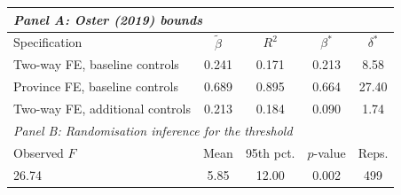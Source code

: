 \begin{tabular}{lcccc}
\toprule
\multicolumn{5}{l}{\textit{Panel A: Oster (2019) bounds}} \\
\midrule
Specification & $\tilde{\beta}$ & $R^2$ & $\beta^*$ & $\delta^*$ \\
\midrule
Two-way FE, baseline controls & 0.241 & 0.171 & 0.213 & 8.58 \\
Province FE, baseline controls & 0.689 & 0.895 & 0.664 & 27.40 \\
Two-way FE, additional controls & 0.213 & 0.184 & 0.090 & 1.74 \\
\midrule
\multicolumn{5}{l}{\textit{Panel B: Randomisation inference for the threshold}} \\
\midrule
Observed $F$ & Mean & 95th pct. & $p$-value & Reps. \\
\midrule
26.74 & 5.85 & 12.00 & 0.002 & 499 \\
\bottomrule
\end{tabular}